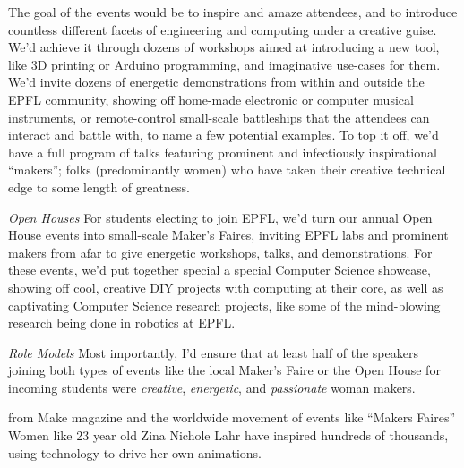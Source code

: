 \documentclass[acmtocl]{acmtrans2m}
\begin{document}
The goal of the events would be to inspire and amaze attendees, and to
introduce countless different facets of engineering and computing under a
creative guise. We'd achieve it through dozens of workshops aimed at
introducing a new tool, like 3D printing or Arduino programming, and
imaginative use-cases for them. We'd invite dozens of energetic demonstrations
from within and outside the EPFL community, showing off home-made electronic
or computer musical instruments, or remote-control small-scale battleships
that the attendees can interact and battle with, to name a few potential
examples. To top it off, we'd have a full program of talks featuring prominent
and infectiously inspirational ``makers''; folks (predominantly women) who
have taken their creative technical edge to some length of greatness.

\textit{\textsf{Open Houses}}\newline
For students electing to join EPFL, we'd turn our annual Open House events
into {small-scale} Maker's Faires, inviting EPFL labs and prominent makers
from afar to give energetic workshops, talks, and demonstrations. For these
events, we'd put together special a special Computer Science showcase, showing
off cool, creative DIY projects with computing at their core, as well as
captivating Computer Science research projects, like some of the mind-blowing
research being done in robotics at EPFL.

\textit{\textsf{Role Models}}\newline
Most importantly, I'd ensure that at least half of the speakers joining both types of events
like the local Maker's Faire or the Open House for incoming students were
\textit{creative}, \textit{energetic}, and \textit{passionate} woman makers.


from Make magazine and
the worldwide movement of events like ``Makers Faires'' Women like 23 year old
Zina Nichole Lahr have inspired hundreds of thousands, using technology to
drive her own animations.
\end{document}
